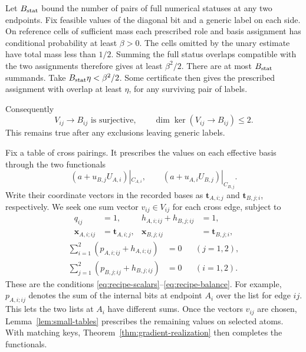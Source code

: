 Let \(B_{\rm stat}\) bound the number of pairs of full numerical
statuses at any two endpoints. Fix feasible values of the diagonal bit
and a generic label on each side. On reference cells of sufficient mass
each prescribed role and basis assignment has conditional probability
at least \(\beta>0\). The cells omitted by the unary estimate have
total mass less than \(1/2\). Summing the full status overlaps compatible
with the two assignments therefore gives at least \(\beta^2/2\).
There are at most \(B_{\rm stat}\) summands. Take
\(B_{\rm stat}\eta<\beta^2/2\). Some certificate then gives the
prescribed assignment with overlap at least \(\eta\), for any surviving
pair of labels.

Consequently
\begin{equation}\label{eq:status-full-projection}
 V_{ij}\longrightarrow B_{ij}\text{ is surjective},\qquad
 \dim\ker(V_{ij}\longrightarrow B_{ij})\le2.
\end{equation}
This remains true after any exclusions leaving generic labels.

Fix a table of cross pairings. It prescribes the values on each
effective basis through the two functionals
\[
(a+u_{B,j}U_{A,i})|_{C_{A,i}},\qquad
(a+u_{A,i}U_{B,j})|_{C_{B,j}}.
\]
Write their coordinate vectors in the recorded bases as
$\mathbf t_{A,i;j}$ and $\mathbf t_{B,j;i}$, respectively. We seek one
sum vector $v_{ij}\in V_{ij}$ for each cross edge, subject to
\begin{equation}
\label{eq:status-local-targets}
\begin{aligned}
q_{ij}&=1,& h_{A,i;ij}+h_{B,j;ij}&=1,\\
\mathbf x_{A,i;ij}&=\mathbf t_{A,i;j},&
\mathbf x_{B,j;ij}&=\mathbf t_{B,j;i},
\end{aligned}
\end{equation}
\begin{equation}
\label{eq:status-coupled-targets}
\begin{aligned}
\sum_{i=1}^2(p_{A,i;ij}+h_{A,i;ij})&=0 &&(j=1,2),\\
\sum_{j=1}^2(p_{B,j;ij}+h_{B,j;ij})&=0 &&(i=1,2).
\end{aligned}
\end{equation}
These are the conditions \eqref{eq:recipe-scalars}--\eqref{eq:recipe-balance}.
For example, \(p_{A,i;ij}\) denotes the sum of the internal bits
at endpoint \(A_i\) over the list for edge \(ij\). This lets the two
lists at \(A_i\) have different sums.
Once the vectors \(v_{ij}\) are chosen, Lemma~\ref{lem:small-tables}
prescribes the remaining values on selected atoms. With matching keys,
Theorem~\ref{thm:gradient-realization} then completes the functionals.

